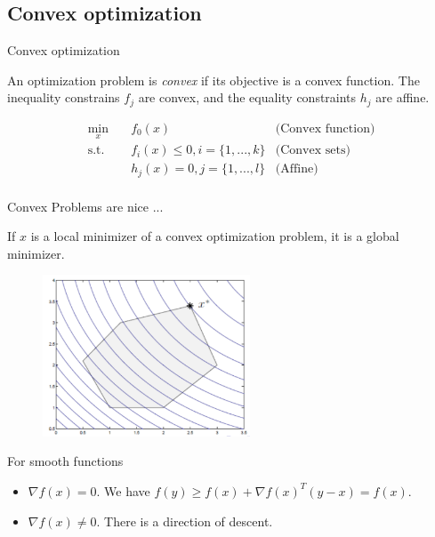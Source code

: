 \documentclass[draft]{beamer}
\begin{document}
\subsection{Convex optimization} 

\begin{frame}{Convex optimization} 
	\begin{define}
		An optimization problem is \emph{convex} if its objective is a convex function. The inequality constrains $f_j$ are convex, and the equality constraints $h_j$ are affine. 
	\end{define} 
	\begin{equation}
		\begin{aligned}
			\min_x \quad & f_0(x)  & \text{(Convex function)} \\ 
			\textrm{s.t.} \quad & f_i(x) \le 0, i = \{1,...,k\} & \text{(Convex sets)} \\  
					 \quad & h_j(x) = 0, j = \{1,...,l\} & \text{(Affine)} \\ 
		\end{aligned}
	\end{equation}
\end{frame}
\begin{frame}
	{Convex Problems are nice ...}
	\begin{thm}
		If $\hat{x}$ is a local minimizer of a convex optimization problem, it is a global minimizer. 
	\end{thm}
	\begin{figure}
		\includegraphics[width=0.55\textwidth]{2018-03-05-12-00-04.png} 
		\end{figure}
	
\end{frame}

\begin{frame}
	{For smooth functions} 
	\begin{thm}
		\begin{itemize}
			\item $\nabla f(x)=0$. We have $f(y) \ge f(x)+\nabla f(x)^T (y-x) = f(x) $. 
			\item  $\nabla f(x) \neq0 $. There is a direction of descent. 
		\end{itemize}
	\end{thm}
\end{frame}
\end{document}
